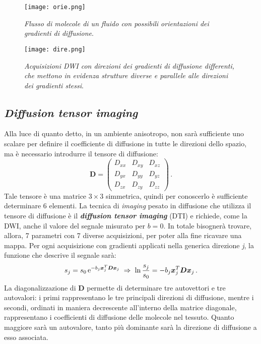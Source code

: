 \documentclass{report}
\numberwithin{equation}{section}
\numberwithin{figure}{section}
\renewcommand{\Vec}{\bm}
\begin{document}
\begin{figure}[htp]
\centering
\texttt{[image: orie.png]}
\caption{\label{fig:orie} \textit{Flusso di molecole di un fluido con possibili orientazioni dei gradienti di diffusione}.}
\end{figure}

\begin{figure}[htp]
\centering
\texttt{[image: dire.png]}
\caption{\label{fig:dire} \textit{Acquisizioni DWI con direzioni dei gradienti di diffusione differenti, che mettono in evidenza strutture diverse e parallele alle direzioni dei gradienti stessi}.}
\end{figure}

\subsection{\textit{Diffusion tensor imaging}}
Alla luce di quanto detto, in un ambiente anisotropo, non sarà sufficiente uno scalare per definire il coefficiente di diffusione in tutte le direzioni dello spazio, ma è necessario introdurre il tensore di diffusione:
\begin{equation}
    \Vec{D} = 
     \begin{pmatrix}
      D_{xx} & D_{xy} & D_{xz} \\
      D_{yx} & D_{yy} & D_{yz} \\
      D_{zx} & D_{zy} & D_{zz} 
     \end{pmatrix}\,.
\end{equation}
Tale tensore è una matrice $3 \times 3$ simmetrica, quindi per conoscerlo è sufficiente determinare 6 elementi. La tecnica di \textit{imaging} pesato in diffusione che utilizza il tensore di diffusione è il \textbf{\textit{diffusion tensor imaging}} (DTI) e richiede, come la DWI, anche il valore del segnale misurato per $b=0$. In totale bisognerà trovare, allora, 7 parametri con 7 diverse acquisizioni, per poter alla fine ricavare una mappa. Per ogni acquisizione con gradienti applicati nella generica direzione \textit{j}, la funzione che descrive il segnale sarà:
\begin{equation}
    s_j = s_0\,\mathrm{e}^{-b_j \Vec{x}_j^T\Vec{Dx}_j} \hspace{3 pt} \Rightarrow \hspace{3 pt} \ln{\frac{s_j}{s_0}} = -b_j \Vec{x}_j^T\Vec{Dx}_j\,.
\end{equation}
La diagonalizzazione di $\Vec{D}$ permette di determinare tre autovettori e tre autovalori: i primi rappresentano le tre principali direzioni di diffusione, mentre i secondi, ordinati in maniera decrescente all'interno della matrice diagonale, rappresentano i coefficienti di diffusione delle molecole nel tessuto. Quanto maggiore sarà un autovalore, tanto più dominante sarà la direzione di diffusione a esso associata.
\end{document}
